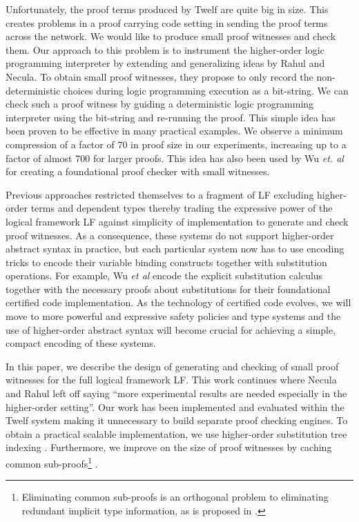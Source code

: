 \documentclass{llncs}
\begin{document}
Unfortunately, the proof terms produced by Twelf are quite big in
size.  This creates problems in a proof carrying code setting in
sending the proof terms across the network. We would like to produce
small proof witnesses and check them. Our approach to this problem is
to instrument the higher-order logic programming interpreter by
extending and generalizing ideas by Rahul and
Necula\cite{Necula+01:oracle}. To obtain small proof witnesses, they
propose to only record the non-deterministic choices during logic
programming execution as a bit-string. We can check such a proof
witness by guiding a deterministic logic programming interpreter using
the bit-string and re-running the proof. This simple idea has been
proven to be effective in many practical examples. We observe a
minimum compression of a factor of 70 in proof size in our
experiments, increasing up to a factor of almost 700 for larger
proofs. This idea has also been used by Wu {\em{et. al}}
\cite{Appel:PPDP03} for creating a foundational proof checker with
small witnesses.

Previous approaches restricted themselves to a fragment of LF
excluding higher-order terms and dependent types thereby trading the
expressive power of the logical framework LF against simplicity of
implementation to generate and check proof witnesses.  As a
consequence, these systems do not support higher-order abstract syntax
in practice, but each particular system now has to use encoding tricks
to encode their variable binding constructs together with substitution
operations. For example, Wu {\em et al}\cite{Appel:PPDP03} encode the
explicit substitution calculus \cite{Abadi:POPL90} together with the
necessary proofs about substitutions for their foundational certified
code implementation. As the technology of certified code evolves, we
will move to more powerful and expressive safety policies and type
systems and the use of higher-order abstract syntax will become
crucial for achieving a simple, compact encoding of these systems.

In this paper, we describe the design of generating and checking
of small proof witnesses for the full logical framework LF. This work
continues where Necula and Rahul \cite{Necula+01:oracle} left off 
saying ``more experimental results are needed especially in the
higher-order setting''. Our work has been implemented and evaluated
within the Twelf system \cite{Pfenning99cade} making it unnecessary to
build separate proof checking engines. To obtain a practical scalable
implementation, we use higher-order substitution tree  indexing
\cite{Pientka:ICLP03}. Furthermore, we improve on the size of proof
witnesses by caching common sub-proofs\footnote{Eliminating
  common sub-proofs is an orthogonal problem to eliminating redundant
  implicit type information, as is proposed in \cite{Necula98lics}.}
. 
\end{document}
